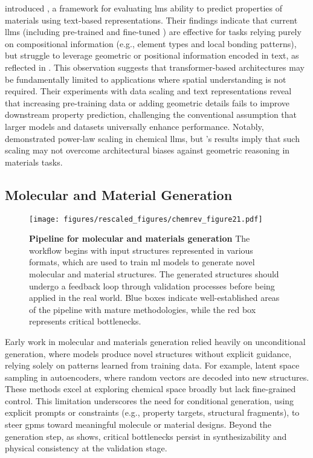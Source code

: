 \noindent \textcite{alampara2024mattext} introduced , a framework for evaluating \glspl{lm} ability to predict properties of materials using text-based representations. 
Their findings indicate that current \glspl{llm} (including pre-trained  and fine-tuned ) are effective for tasks relying purely on compositional information (e.g., element types and local bonding patterns), but struggle to leverage geometric or positional information encoded in text, as reflected in . 
This observation suggests that transformer-based architectures may be fundamentally limited to applications where spatial understanding is not required. 
Their experiments with data scaling and text representations reveal that increasing pre-training data or adding geometric details fails to improve downstream property prediction, challenging the conventional assumption that larger models and datasets universally enhance performance. \autocite{frey2023neural} 
Notably, \textcite{frey2023neural} demonstrated power-law scaling in chemical \glspl{llm}, but 's results imply that such scaling may not overcome architectural biases against geometric reasoning in materials tasks.\autocite{gruver2024promises}

\subsection{Molecular and Material Generation} \label{sec:mol_generation}

\begin{figure}[htbp!]
    \centering
    \texttt{[image: figures/rescaled\_figures/chemrev\_figure21.pdf]}
    \caption{\textbf{Pipeline for molecular and materials generation} The workflow begins with input structures represented in various formats, which are used to train \gls{ml} models to generate novel molecular and material structures. The generated structures should undergo a feedback loop through validation processes before being applied in the real world. Blue boxes indicate well-established areas of the pipeline with mature methodologies, while the red box represents critical bottlenecks.}
    \label{fig:generation}
\end{figure}

\noindent Early work in molecular and materials generation relied heavily on unconditional generation, where models produce novel structures without explicit guidance, relying solely on patterns learned from training data. For example, latent space sampling in autoencoders, where random vectors are decoded into new structures.\autocite{yoshikai2024novel} These methods excel at exploring chemical space broadly but lack fine-grained control. 
This limitation underscores the need for conditional generation, using explicit prompts or constraints (e.g., property targets, structural fragments), to steer \glspl{gpm} toward meaningful molecule or material designs. 
Beyond the generation step, as  shows, critical bottlenecks persist in synthesizability and physical consistency at the validation stage.

